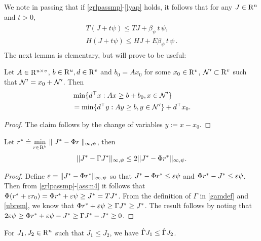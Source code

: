 We note in passing that if \cref{grlpassmp}-\eqref{lyap} holds, it follows that for any $J\in \mathrm{R}^n$ and $t>0$,
\begin{align}\label{eq:psilin}
\begin{split}
T(J+ t \psi ) \le TJ + \beta_{\psi}\,t\,  \psi,\\
H(J+ t \psi ) \le HJ + E \beta_{\psi}\,t\,  \psi\,.
\end{split}
\end{align}
%
The next lemma is elementary, but will prove to be useful:
\begin{lemma}\label{lpsol}
Let $A\in \mathrm{R}^{u\times v}$, $b\in \mathrm{R}^u,d\in \mathrm{R}^v$ and $b_0=Ax_0$ for
some $x_0 \in \mathrm{R}^v$, $\mathcal{N}' \subset \mathrm{R}^v$ such that $\mathcal{N}' =x_0+ \mathcal{N}'$. Then
\begin{align}
&\min\{d^\top x:Ax\geq b+b_0, x\in \mathcal{N}'\} \nonumber\\
&=\min\{d^\top y:Ay \geq b, y \in \mathcal{N}' \}+d^\top x_0.
\end{align}
\end{lemma}
\begin{proof}
The claim follows by the change of variables $y := x-x_0$.
\end{proof}
\noindent 
\begin{lemma}\label{bestbndmn}
Let $r^*\doteq\underset{r\in \mathrm{R}^k}{\min}\parallel J^*-\Phi r\parallel_{\infty,\psi}$, then
\begin{align}
||J^*-\Gamma J^*||_{\infty,\psi}\leq 2||J^*-\Phi r^*||_{\infty,\psi}.
\end{align}
\end{lemma}
\begin{proof}
Define $\varepsilon = \|J^* - \Phi r^*\|_{\infty,\psi}$ so that
$ J^*-\Phi r^* \le \varepsilon \psi$ and $\Phi r^* - J^*\le \varepsilon \psi$. Then from \cref{grlpassmp}-\eqref{ass:n4} it follows that $\Phi( r^* + \varepsilon r_0 ) = \Phi r^* + \varepsilon \psi \ge J^* = T J^*$. From the definition of $\Gamma$ in \eqref{gamdef} and \cref{ubrem}, we know that $\Phi r^*+\varepsilon \psi \geq \Gamma J^*\geq J^*$. The result follows by noting that $2\varepsilon\psi\geq \Phi r^*+\varepsilon\psi -J^*\geq \Gamma J^*-J^*\geq 0$.
\end{proof}
\begin{lemma}\label{tgmonotone}
For $J_1, J_2\in \mathrm{R}^n$ such that $J_1\leq J_2$, we have $\hat{\Gamma} J_1\leq \hat{\Gamma} J_2$.
\end{lemma}
